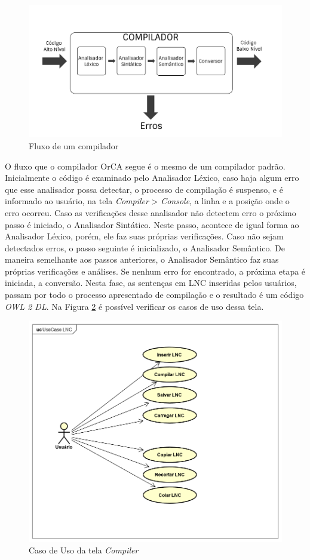 \documentclass{bcc}
\begin{document}
\begin{figure}[H]
\centering
\includegraphics[width=.8\textwidth]{Figuras/compiladorscheme.png}
\caption{Fluxo de um compilador}
\label{fig:compilerscheme}
\end{figure}

O fluxo que o compilador OrCA segue é o mesmo de um compilador padrão. Inicialmente o código é examinado pelo Analisador Léxico, caso haja algum erro que esse analisador possa detectar, o processo de compilação é suspenso, e é informado ao usuário, na tela \textit{Compiler} > \textit{Console}, a linha e a posição onde o erro ocorreu. Caso as verificações desse analisador não detectem erro o próximo passo é iniciado, o Analisador Sintático. Neste passo, acontece de igual forma ao Analisador Léxico, porém, ele faz suas próprias verificações. Caso não sejam detectados erros, o passo seguinte é inicializado, o Analisador Semântico. De maneira semelhante aos passos anteriores, o Analisador Semântico faz suas próprias verificações e análises. Se nenhum erro for encontrado, a próxima etapa é iniciada, a conversão. Nesta fase, as sentenças em LNC inseridas pelos usuários, passam por todo o processo apresentado de compilação e o resultado é um código \textit{OWL 2 DL}. Na Figura \ref{fig:uclnc} é possível verificar os casos de uso dessa tela.

\begin{figure}[H]
\centering
\includegraphics[width=.6\textwidth]{Figuras/UseCaseLNC.png}
\caption{Caso de Uso da tela \textit{Compiler}} 
\label{fig:uclnc}
\end{figure}
\end{document}
